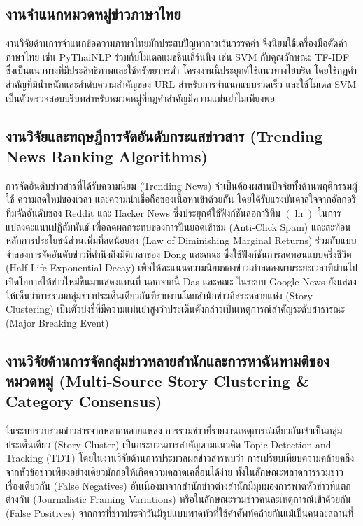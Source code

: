 \subsection{งานจำแนกหมวดหมู่ข่าวภาษาไทย}

งานวิจัยด้านการจำแนกข้อความภาษาไทยมักประสบปัญหาการเว้นวรรคคำ จึงนิยมใช้เครื่องมือตัดคำภาษาไทย เช่น PyThaiNLP \cite{pythainlp2021} ร่วมกับโมเดลแมชชีนเลิร์นนิง เช่น SVM กับคุณลักษณะ TF-IDF ซึ่งเป็นแนวทางที่มีประสิทธิภาพและใช้ทรัพยากรต่ำ โครงงานนี้ประยุกต์ใช้แนวทางไฮบริด โดยใช้กฎคำสำคัญที่มีน้ำหนักและลำดับความสำคัญของ URL สำหรับการจำแนกแบบรวดเร็ว และใช้โมเดล SVM เป็นตัวตรวจสอบบริบทสำหรับหมวดหมู่ที่กฎคำสำคัญมีความแม่นยำไม่เพียงพอ

\subsection{งานวิจัยและทฤษฎีการจัดอันดับกระแสข่าวสาร (Trending News Ranking Algorithms)}

การจัดอันดับข่าวสารที่ได้รับความนิยม (Trending News) จำเป็นต้องผสานปัจจัยทั้งด้านพฤติกรรมผู้ใช้ ความสดใหม่ของเวลา และความน่าเชื่อถือของเนื้อหาเข้าด้วยกัน โดยได้รับแรงบันดาลใจจากอัลกอริทึมจัดอันดับของ Reddit \cite{salihefendic2010, swartz2005} และ Hacker News \cite{graham2009} ซึ่งประยุกต์ใช้ฟังก์ชันลอการิทึม $(\ln)$ ในการแปลงคะแนนปฏิสัมพันธ์ เพื่อลดผลกระทบของการปั่นยอดเข้าชม (Anti-Click Spam) และสะท้อนหลักการประโยชน์ส่วนเพิ่มที่ลดน้อยลง (Law of Diminishing Marginal Returns) ร่วมกับแบบจำลองการจัดอันดับข่าวที่คำนึงถึงมิติเวลาของ Dong และคณะ \cite{dong2010} ซึ่งใช้ฟังก์ชันการลดทอนแบบครึ่งชีวิต (Half-Life Exponential Decay) เพื่อให้คะแนนความนิยมของข่าวเก่าลดลงตามระยะเวลาที่ผ่านไป เปิดโอกาสให้ข่าวใหม่ขึ้นมาแสดงแทนที่ นอกจากนี้ Das และคณะ \cite{das2007} ในระบบ Google News ยังแสดงให้เห็นว่าการรวมกลุ่มข่าวประเด็นเดียวกันที่รายงานโดยสำนักข่าวอิสระหลายแห่ง (Story Clustering) เป็นตัวบ่งชี้ที่มีความแม่นยำสูงว่าประเด็นดังกล่าวเป็นเหตุการณ์สำคัญระดับสาธารณะ (Major Breaking Event)

\subsection{งานวิจัยด้านการจัดกลุ่มข่าวหลายสำนักและการหาฉันทามติของหมวดหมู่ (Multi-Source Story Clustering \& Category Consensus)}

ในระบบรวบรวมข่าวสารจากหลากหลายแหล่ง การรวมข่าวที่รายงานเหตุการณ์เดียวกันเข้าเป็นกลุ่มประเด็นเดียว (Story Cluster) เป็นกระบวนการสำคัญตามแนวคิด Topic Detection and Tracking (TDT) โดยในงานวิจัยด้านการประมวลผลข่าวสารพบว่า การเปรียบเทียบความคล้ายคลึงจากหัวข้อข่าวเพียงอย่างเดียวมักก่อให้เกิดความคลาดเคลื่อนได้ง่าย ทั้งในลักษณะพลาดการรวมข่าวเรื่องเดียวกัน (False Negatives) อันเนื่องมาจากสำนักข่าวต่างสำนักมีมุมมองการพาดหัวข่าวที่แตกต่างกัน (Journalistic Framing Variations) หรือในลักษณะรวมข่าวคนละเหตุการณ์เข้าด้วยกัน (False Positives) จากการที่ข่าวประจำวันมีรูปแบบพาดหัวที่ใช้คำศัพท์คล้ายกันแม้เป็นคนละสถานที่

